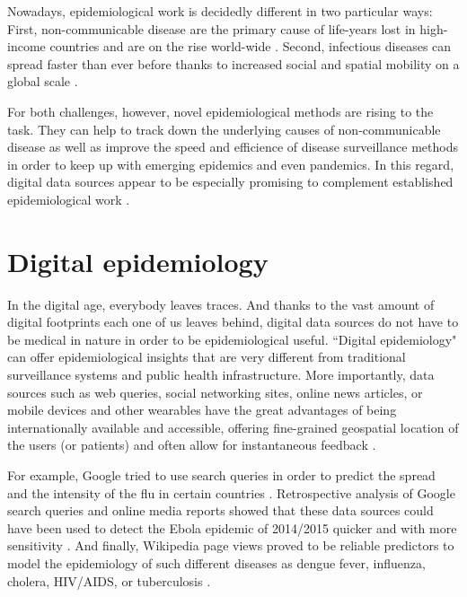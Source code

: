 \documentclass[11pt, a4paper,twoside]{report}\usepackage[]{graphicx}\usepackage[]{color}
\begin{document}
Nowadays, epidemiological work is decidedly different in two particular ways: First, non-communicable disease are the primary cause of life-years lost in high-income countries and are on the rise world-wide \citep{lozano_global_2013}. Second, infectious diseases can spread faster than ever before thanks to increased social and spatial mobility on a global scale \citep{hufnagel_forecast_2004}. 

For both challenges, however, novel epidemiological methods are rising to the task. They can help to track down the underlying causes of non-communicable disease as well as improve the speed and efficience of disease surveillance methods in order to keep up with emerging epidemics and even pandemics. In this regard, digital data sources appear to be especially promising to complement established epidemiological work \citep{salathe_digital_2012, simonsen_infectious_2016}.

\section{Digital epidemiology}

In the digital age, everybody leaves traces. And thanks to the vast amount of digital footprints each one of us leaves behind, digital data sources do not have to be medical in nature in order to be epidemiological useful. ``Digital epidemiology" can offer epidemiological insights that are very different from traditional surveillance systems and public health infrastructure. More importantly, data sources such as web queries, social networking sites, online news articles, or mobile devices and other wearables have the great advantages of being internationally available and accessible, offering fine-grained geospatial location of the users (or patients) and often allow for instantaneous feedback \citep{salathe_digital_2012}. 

For example, Google tried to use search queries in order to predict the spread and the intensity of the flu in certain countries \citep{ginsberg_detecting_2009}. Retrospective analysis of Google search queries and online media reports showed that these data sources could have been used to detect the Ebola epidemic of 2014/2015 quicker and with more sensitivity \citep{anema_digital_2014, milinovich_role_2015}. And finally, Wikipedia page views proved to be reliable predictors to model the epidemiology of such different diseases as dengue fever, influenza, cholera, HIV/AIDS, or tuberculosis \citep{generous_global_2014}. 
\end{document}
